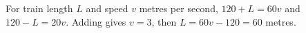 For train length $L$ and speed $v$ metres per second, $120+L=60v$ and $120-L=20v$. Adding gives $v=3$, then $L=60v-120=\boxed{60}$ metres.
